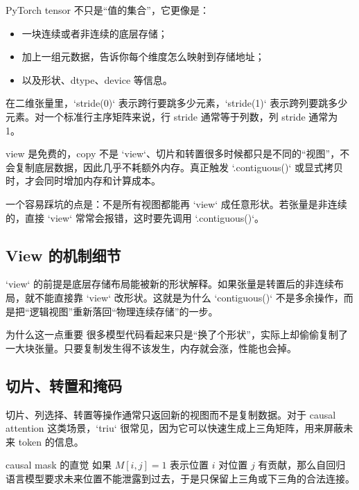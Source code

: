 \documentclass[a4paper]{article}
\begin{document}
PyTorch tensor 不只是“值的集合”，它更像是：
\begin{itemize}
    \item 一块连续或者非连续的底层存储；
    \item 加上一组元数据，告诉你每个维度怎么映射到存储地址；
    \item 以及形状、dtype、device 等信息。
\end{itemize}

在二维张量里，`stride(0)` 表示跨行要跳多少元素，`stride(1)` 表示跨列要跳多少元素。对一个标准行主序矩阵来说，行 stride 通常等于列数，列 stride 通常为 1。

\begin{importantbox}{view 是免费的，copy 不是}
`view`、切片和转置很多时候都只是不同的“视图”，不会复制底层数据，因此几乎不耗额外内存。真正触发 `.contiguous()` 或显式拷贝时，才会同时增加内存和计算成本。
\end{importantbox}

一个容易踩坑的点是：不是所有视图都能再 `view` 成任意形状。若张量是非连续的，直接 `view` 常常会报错，这时要先调用 `.contiguous()`。

\subsection{View 的机制细节}

`view` 的前提是底层存储布局能被新的形状解释。如果张量是转置后的非连续布局，就不能直接靠 `view` 改形状。这就是为什么 `contiguous()` 不是多余操作，而是把“逻辑视图”重新落回“物理连续存储”的一步。

\begin{warningbox}{为什么这一点重要}
很多模型代码看起来只是“换了个形状”，实际上却偷偷复制了一大块张量。只要复制发生得不该发生，内存就会涨，性能也会掉。
\end{warningbox}

\subsection{切片、转置和掩码}

切片、列选择、转置等操作通常只返回新的视图而不是复制数据。对于 causal attention 这类场景，`triu` 很常见，因为它可以快速生成上三角矩阵，用来屏蔽未来 token 的信息。

\begin{knowledgebox}{causal mask 的直觉}
如果 \(M[i,j]=1\) 表示位置 \(i\) 对位置 \(j\) 有贡献，那么自回归语言模型要求未来位置不能泄露到过去，于是只保留上三角或下三角的合法连接。
\end{knowledgebox}
\end{document}
